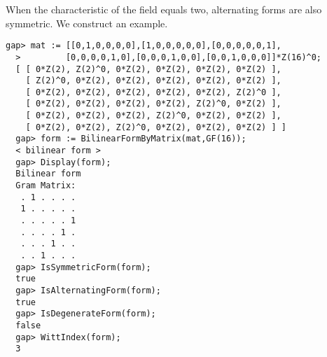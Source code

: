 \documentclass[a4paper,11pt]{report}
\begin{document}
{{{\begin{Verbatim}[fontsize=\small,frame=single,label=Example]
\end{Verbatim}
 When the characteristic of the field equals two, alternating forms are also
symmetric. We construct an example. 
\begin{Verbatim}[fontsize=\small,frame=single,label=Example]
  gap> mat := [[0,1,0,0,0,0],[1,0,0,0,0,0],[0,0,0,0,0,1],
  >         [0,0,0,0,1,0],[0,0,0,1,0,0],[0,0,1,0,0,0]]*Z(16)^0;
  [ [ 0*Z(2), Z(2)^0, 0*Z(2), 0*Z(2), 0*Z(2), 0*Z(2) ], 
    [ Z(2)^0, 0*Z(2), 0*Z(2), 0*Z(2), 0*Z(2), 0*Z(2) ], 
    [ 0*Z(2), 0*Z(2), 0*Z(2), 0*Z(2), 0*Z(2), Z(2)^0 ], 
    [ 0*Z(2), 0*Z(2), 0*Z(2), 0*Z(2), Z(2)^0, 0*Z(2) ], 
    [ 0*Z(2), 0*Z(2), 0*Z(2), Z(2)^0, 0*Z(2), 0*Z(2) ], 
    [ 0*Z(2), 0*Z(2), Z(2)^0, 0*Z(2), 0*Z(2), 0*Z(2) ] ]
  gap> form := BilinearFormByMatrix(mat,GF(16));
  < bilinear form >
  gap> Display(form);
  Bilinear form
  Gram Matrix:
   . 1 . . . .
   1 . . . . .
   . . . . . 1
   . . . . 1 .
   . . . 1 . .
   . . 1 . . .
  gap> IsSymmetricForm(form);
  true
  gap> IsAlternatingForm(form);
  true
  gap> IsDegenerateForm(form);
  false
  gap> WittIndex(form);
  3
   

\end{Verbatim}}}}
\end{document}
